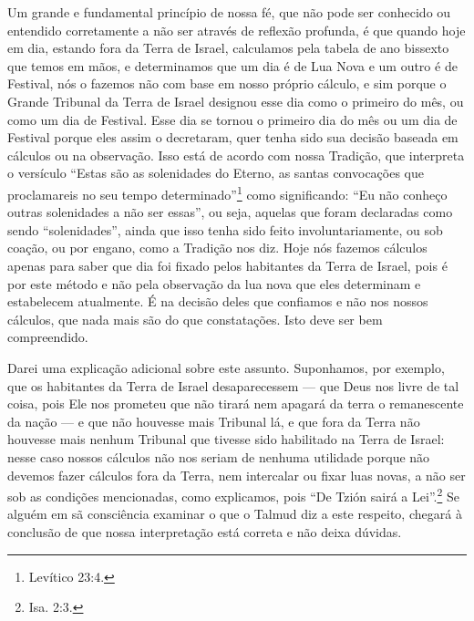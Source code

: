 \begin{multicols}{2}
Um grande e fundamental princípio de nossa fé, que não pode ser
conhecido ou entendido corretamente a não ser através de reflexão
profunda, é que quando hoje em dia, estando fora da Terra de Israel,
calculamos pela tabela de ano bissexto que temos em mãos, e
determinamos que um dia é de Lua Nova e um outro é de Festival, nós o
fazemos não com base em nosso próprio cálculo, e sim porque o Grande
Tribunal da Terra de Israel designou esse dia como o primeiro do mês, ou
como um dia de Festival. Esse dia se tornou o primeiro dia do mês ou um
dia de Festival porque eles assim o decretaram, quer tenha sido sua
decisão baseada em cálculos ou na observação. Isso está de acordo com
nossa Tradição, que interpreta o versículo ``Estas são as solenidades do
Eterno, as santas convocações que proclamareis no seu tempo
determinado''\footnote{Levítico 23:4.} como significando: ``Eu não conheço outras
solenidades a não ser essas'', ou seja, aquelas que foram declaradas
como sendo ``solenidades'', ainda que isso tenha sido feito
involuntariamente, ou sob coação, ou por engano, como a Tradição nos
diz. Hoje nós fazemos cálculos apenas para saber que dia foi fixado
pelos habitantes da Terra de Israel, pois é por este método e não pela
observação da lua nova que eles determinam e estabelecem atualmente. É
na decisão deles que confiamos e não nos nossos cálculos, que nada mais
são do que constatações. Isto deve ser bem compreendido.

Darei uma explicação adicional sobre este assunto. Suponhamos, por
exemplo, que os habitantes da Terra de Israel desaparecessem --- que
Deus nos livre de tal coisa, pois Ele nos prometeu que não tirará nem
apagará da terra o remanescente da nação --- e que não houvesse mais
Tribunal lá, e que fora da Terra não houvesse mais nenhum Tribunal que
tivesse sido habilitado na Terra de Israel: nesse caso nossos cálculos
não nos seriam de nenhuma utilidade porque não devemos fazer cálculos fora da Terra, nem intercalar ou fixar luas novas, a não
ser sob as condições mencionadas, como explicamos, pois ``De Tzión\starr{} sairá
a Lei''.\footnote{Isa. 2:3.} Se alguém em sã consciência examinar o
que o Talmud\starr{} diz a este respeito, chegará à conclusão de que nossa
interpretação está correta e não deixa dúvidas.


\end{multicols}
